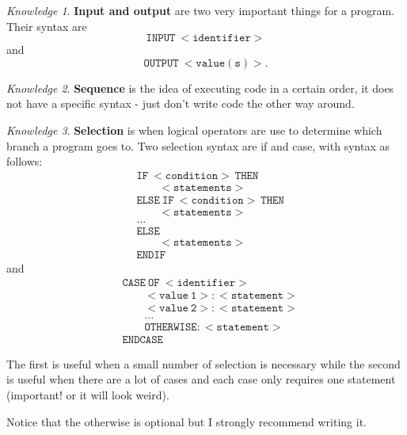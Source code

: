 \documentclass[8pt]{article}
\theoremstyle{remark}
\newtheorem{knowledge}{Knowledge}[subsection]
\begin{document}
            \begin{knowledge}
                \textbf{Input and output} are two very important things for a program. Their syntax are
                \[
                    \mathtt{INPUT\ <identifier>}
                \]
                and
                \[
                    \mathtt{OUTPUT\ <value(s)>}.
                \]
            \end{knowledge}

            \begin{knowledge}
                \textbf{Sequence} is the idea of executing code in a certain order, it does not have a specific syntax - just don't write code the other way around.
            \end{knowledge}

            \begin{knowledge}
                \textbf{Selection} is when logical operators are use to determine which branch a program goes to. Two selection syntax are if and case, with syntax as follows:
                \begin{align*}    
                    &\mathtt{IF\ <condition>\ THEN}\\
                    &\qquad \mathtt{<statements>}\\
                    &\mathtt{ELSE\ IF\ <condition>\ THEN}\\
                    &\qquad \mathtt{<statements>}\\
                    &\ldots\\
                    &\mathtt{ELSE}\\
                    &\qquad \mathtt{<statements>}\\
                    &\mathtt{ENDIF}
                \end{align*}
                and
                \begin{align*}
                    &\mathtt{CASE\ OF\ <identifier>}\\
                    &\qquad \mathtt{<value\ 1>:<statement>}\\
                    &\qquad \mathtt{<value\ 2>:<statement>}\\
                    &\qquad \ldots\\
                    &\qquad \mathtt{OTHERWISE:<statement>}\\
                    &\mathtt{ENDCASE}
                \end{align*}

                The first is useful when a small number of selection is necessary while the second is useful when there are a lot of cases and each case only requires one statement (important! or it will look weird).

                Notice that the otherwise is optional but I strongly recommend writing it.
            \end{knowledge}
\end{document}
